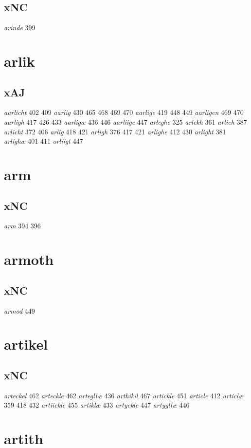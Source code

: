 \documentclass[a4paper,twocolumn]{article}
\begin{document}
\subsection{xNC}
\label{sec:org67b0489}
\emph{arinde} 399 
\section{arlik}
\label{sec:org6b1b20e}
\subsection{xAJ}
\label{sec:orgf9463ff}
\emph{aarlicht} 402 409 \emph{aarlig} 430 465 468 469 470 \emph{aarlige} 419 448 449 \emph{aarligen} 469 470 \emph{aarligh} 417 426 433 \emph{aarligæ} 436 446 \emph{aarliige} 447 \emph{arleghe} 325 \emph{arlekh} 361 \emph{arlich} 387 \emph{arlicht} 372 406 \emph{arlig} 418 421 \emph{arligh} 376 417 421 \emph{arlighe} 412 430 \emph{arlight} 381 \emph{arlighæ} 401 411 \emph{orliigt} 447 
\section{arm}
\label{sec:org8608d44}
\subsection{xNC}
\label{sec:org1121461}
\emph{arm} 394 396 
\section{armoth}
\label{sec:orgee03ba0}
\subsection{xNC}
\label{sec:org475c3e9}
\emph{armod} 449 
\section{artikel}
\label{sec:org578139f}
\subsection{xNC}
\label{sec:orgc0d26f9}
\emph{arteckel} 462 \emph{arteckle} 462 \emph{artegllæ} 436 \emph{arthikil} 467 \emph{artickle} 451 \emph{article} 412 \emph{articlæ} 359 418 432 \emph{artiickle} 455 \emph{artiklæ} 433 \emph{artyckle} 447 \emph{artygllæ} 446 
\section{artith}
\label{sec:orgce0e033}
\end{document}
